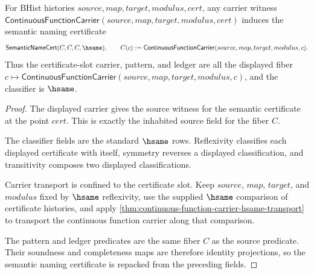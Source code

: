 \begin{theorem}
\label{thm:continuous-function-carrier-certificate-semantic-namecert}
For BHist histories $source,map,target,modulus,cert$, any carrier witness
$\mathsf{ContinuousFunctionCarrier}(source,map,target,modulus,cert)$ induces
the semantic naming certificate
$$
\mathsf{SemanticNameCert}(C,C,C,\hsame),
\qquad
C(c) :=
\mathsf{ContinuousFunctionCarrier}(source,map,target,modulus,c).
$$
Thus the certificate-slot carrier, pattern, and ledger are all the displayed
fiber $c\mapsto\mathsf{ContinuousFunctionCarrier}(source,map,target,modulus,c)$,
and the classifier is $\hsame$.
\end{theorem}
\begin{proof}
The displayed carrier gives the source witness for the semantic certificate at
the point $cert$. This is exactly the inhabited source field for the fiber $C$.

The classifier fields are the standard $\hsame$ rows. Reflexivity classifies
each displayed certificate with itself, symmetry reverses a displayed
classification, and transitivity composes two displayed classifications.

Carrier transport is confined to the certificate slot. Keep $source$, $map$,
$target$, and $modulus$ fixed by $\hsame$ reflexivity, use the supplied
$\hsame$ comparison of certificate histories, and apply
\autoref{thm:continuous-function-carrier-hsame-transport} to transport the
continuous function carrier along that comparison.

The pattern and ledger predicates are the same fiber $C$ as the source
predicate. Their soundness and completeness maps are therefore identity
projections, so the semantic naming certificate is repacked from the preceding
fields.
\end{proof}
